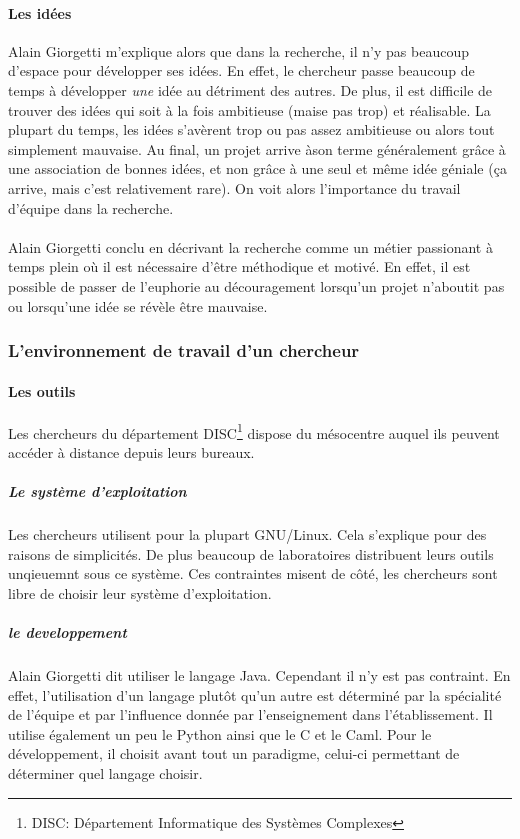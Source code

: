 \documentclass[a4paper,12pt, draft]{report}
\begin{document}
\paragraph{Les idées}
Alain Giorgetti m'explique alors que dans la recherche, il n'y pas beaucoup d'espace pour développer ses idées. En effet, le chercheur passe beaucoup de temps à développer \textit{une} idée au détriment des autres.
De plus, il est difficile de trouver des idées qui soit à la fois ambitieuse (maise pas trop) et réalisable. La plupart du temps, les idées s'avèrent trop ou pas assez ambitieuse ou alors tout simplement mauvaise. Au final, un projet arrive àson terme généralement grâce à une association de bonnes idées, et non grâce à une seul et même idée géniale (ça arrive, mais c'est relativement rare).
On voit alors l'importance du travail d'équipe dans la recherche.

\paragraph{}
Alain Giorgetti conclu en décrivant la recherche comme un métier passionant à temps plein où il est nécessaire d'être méthodique et motivé. En effet, il est possible de passer de l'euphorie au découragement lorsqu'un projet n'aboutit pas ou lorsqu'une idée se révèle être mauvaise.


\subsubsection{L'environnement de travail d'un chercheur}
\paragraph{Les outils}
Les chercheurs du département DISC\footnote{\textsc{DISC}: Département Informatique des Systèmes Complexes} dispose du mésocentre auquel ils peuvent accéder à distance depuis leurs bureaux.

\subparagraph{Le système d'exploitation}
Les chercheurs utilisent pour la plupart GNU/Linux. Cela s'explique pour des raisons de simplicités. De plus beaucoup de laboratoires distribuent leurs outils unqieuemnt sous ce système. Ces contraintes misent de côté, les chercheurs sont libre de choisir leur système d'exploitation.

\subparagraph{le developpement}
Alain Giorgetti dit utiliser le langage Java. Cependant il n'y est pas contraint. En effet, l'utilisation d'un langage plutôt qu'un autre est déterminé par la spécialité de l'équipe et par l'influence donnée par l'enseignement dans l'établissement. Il utilise également un peu le Python ainsi que le C et le Caml.
Pour le développement, il choisit avant tout un paradigme, celui-ci permettant de déterminer quel langage choisir.
\end{document}
